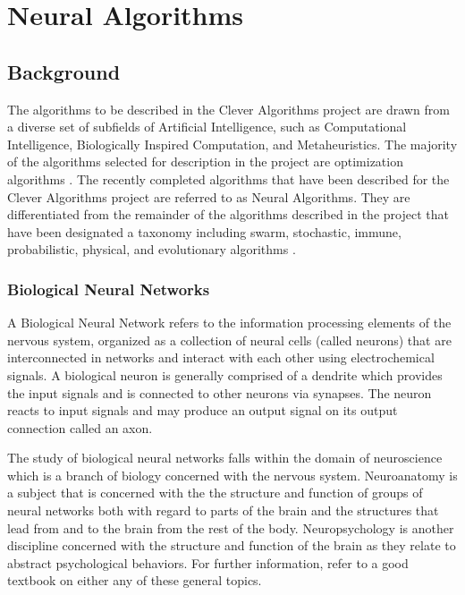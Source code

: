 \documentclass[a4paper, 11pt]{article}
\begin{document}
\section{Neural Algorithms}
\label{sec:algorithms}

% 
% 
\subsection{Background}
The algorithms to be described in the Clever Algorithms project are drawn from a diverse set of subfields of Artificial Intelligence, such as Computational Intelligence, Biologically Inspired Computation, and Metaheuristics. The majority of the algorithms selected for description in the project are optimization algorithms \cite{Brownlee2010b}. 
The recently completed algorithms that have been described for the Clever Algorithms project are referred to as Neural Algorithms. They are differentiated from the remainder of the algorithms described in the project that have been designated a taxonomy including swarm, stochastic, immune, probabilistic, physical, and evolutionary algorithms \cite{Brownlee2010b}. 

\subsubsection{Biological Neural Networks}
A Biological Neural Network refers to the information processing elements of the nervous system, organized as a collection of neural cells (called neurons) that are interconnected in networks and interact with each other using electrochemical signals. A biological neuron is generally comprised of a dendrite which provides the input signals and is connected to other neurons via synapses. The neuron reacts to input signals and may produce an output signal on its output connection called an axon.

The study of biological neural networks falls within the domain of neuroscience which is a branch of biology concerned with the nervous system. 
Neuroanatomy is a subject that is concerned with the the structure and function of groups of neural networks both with regard to parts of the brain and the structures that lead from and to the brain from the rest of the body. 
Neuropsychology is another discipline concerned with the structure and function of the brain as they relate to abstract psychological behaviors.
For further information, refer to a good textbook on either any of these general topics.
\end{document}
